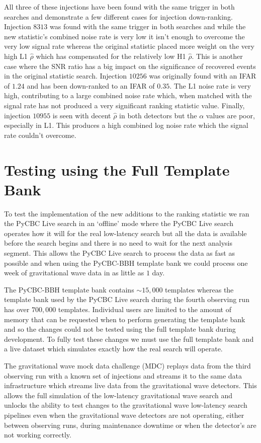 %
All three of these injections have been found with the same trigger in both searches and demonstrate a few different cases for injection down-ranking. Injection $8313$ was found with the same trigger in both searches and while the new statistic's combined noise rate is very low it isn't enough to overcome the very low signal rate whereas the original statistic placed more weight on the very high L1 $\hat{\rho}$ which has compensated for the relatively low H1 $\hat{\rho}$. This is another case where the SNR ratio has a big impact on the significance of recovered events in the original statistic search. Injection $10256$ was originally found with an IFAR of $1.24$ and has been down-ranked to an IFAR of $0.35$. The L1 noise rate is very high, contributing to a large combined noise rate which, when matched with the signal rate has not produced a very significant ranking statistic value. Finally, injection $10955$ is seen with decent $\hat{\rho}$ in both detectors but the $\alpha$ values are poor, especially in L1. This produces a high combined log noise rate which the signal rate couldn't overcome. 

\section{\label{5:sec:mdc-test}Testing using the Full Template Bank}

To test the implementation of the new additions to the ranking statistic we ran the PyCBC Live search in an `offline' mode where the PyCBC Live search operates how it will for the real low-latency search but all the data is available before the search begins and there is no need to wait for the next analysis segment. This allows the PyCBC Live search to process the data as fast as possible and when using the PyCBC-BBH template bank we could process one week of gravitational wave data in as little as $1$ day.

The PyCBC-BBH template bank contains $\sim15,000$ templates whereas the template bank used by the PyCBC Live search during the fourth observing run has over $700,000$ templates. Individual users are limited to the amount of memory that can be requested when to perform generating the template bank and so the changes could not be tested using the full template bank during development. To fully test these changes we must use the full template bank and a live dataset which simulates exactly how the real search will operate.

The gravitational wave mock data challenge (MDC) replays data from the third observing run with a known set of injections and streams it to the same data infrastructure which streams live data from the gravitational wave detectors. This allows the full simulation of the low-latency gravitational wave search and unlocks the ability to test changes to the gravitational wave low-latency search pipelines even when the gravitational wave detectors are not operating, either between observing runs, during maintenance downtime or when the detector's are not working correctly.

